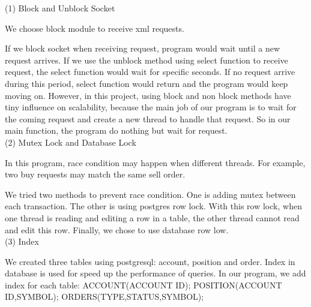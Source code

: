\documentclass{article}
\begin{document}
(1) Block and Unblock Socket

We choose block module to receive xml requests. 

If we block socket when receiving request, program would wait until a new request arrives. If we use the unblock method using select function to receive request, the select function would wait for specific seconds. If no request arrive during this period, select function would return and the program would keep moving on. However, in this project, using block and non block methods have tiny influence on scalability, because the main job of our program is to wait for the coming request and create a new thread to handle that request. So in our main function, the program do nothing but wait for request. \\

(2) Mutex Lock and Database Lock

In this program, race condition may happen when different threads. For example, two buy requests may match the same sell order.  

We tried two methods to prevent race condition. One is adding mutex between each transaction. The other is using postgres row lock. With this row lock, when one thread is reading and editing a row in a table, the other thread cannot read and edit this row. Finally, we chose to use database row low.\\

(3) Index 

We created three tables using postgresql: account, position and order.
Index in database is used for speed up the performance of queries. In our program, we add index for each table:
ACCOUNT(ACCOUNT ID);
POSITION(ACCOUNT ID,SYMBOL);
ORDERS(TYPE,STATUS,SYMBOL);



 
\end{document}
